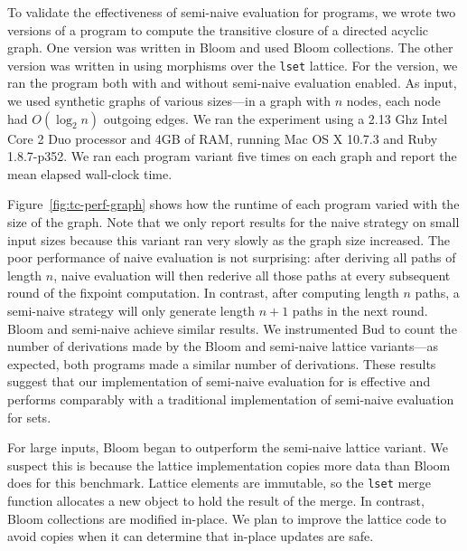 To validate the effectiveness of semi-naive evaluation for \lang programs, we
wrote two versions of a program to compute the transitive closure of a directed
acyclic graph. One version was written in Bloom and used Bloom collections. The
other version was written in \lang using morphisms over the \texttt{lset}
lattice. For the \lang version, we ran the program both with and without
semi-naive evaluation enabled. As input, we used synthetic graphs of various
sizes---in a graph with $n$ nodes, each node had $O(\log_2 n)$ outgoing
edges. We ran the experiment using a 2.13 Ghz Intel Core 2 Duo processor and 4GB
of RAM, running Mac OS X 10.7.3 and Ruby 1.8.7-p352. We ran each program variant
five times on each graph and report the mean elapsed wall-clock time.

Figure~\ref{fig:tc-perf-graph} shows how the runtime of each program varied with
the size of the graph. Note that we only report results for the naive \lang
strategy on small input sizes because this variant ran very slowly as the graph
size increased. The poor performance of naive evaluation is not surprising:
after deriving all paths of length $n$, naive evaluation will then rederive all
those paths at every subsequent round of the fixpoint computation. In contrast,
after computing length $n$ paths, a semi-naive strategy will only generate
length $n+1$ paths in the next round. Bloom and semi-naive \lang achieve similar
results. We instrumented Bud to count the number of derivations made by the
Bloom and semi-naive lattice variants---as expected, both programs made a
similar number of derivations. These results suggest that our implementation of
semi-naive evaluation for \lang is effective and performs comparably with
a traditional implementation of semi-naive evaluation for sets.

For large inputs, Bloom began to outperform the semi-naive lattice variant. We
suspect this is because the lattice implementation copies more data than Bloom
does for this benchmark. Lattice elements are immutable, so the \texttt{lset}
merge function allocates a new object to hold the result of the merge. In
contrast, Bloom collections are modified in-place. We plan to improve the
lattice code to avoid copies when it can determine that in-place updates are
safe.

